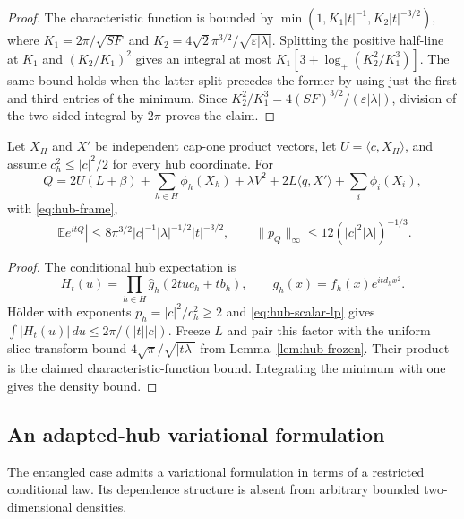 \begin{proof}
The characteristic function is bounded by
$\min(1,K_1|t|^{-1},K_2|t|^{-3/2})$, where
$K_1=2\pi/\sqrt{SF}$ and
$K_2=4\sqrt2\pi^{3/2}/\sqrt{\varepsilon|\lambda|}$.
Splitting the positive half-line at $K_1$ and $(K_2/K_1)^2$ gives
an integral at most
$K_1[3+\log_+(K_2^2/K_1^3)]$.
The same bound holds when the latter split precedes the former by
using just the first and third entries of the minimum.
Since $K_2^2/K_1^3=4(SF)^{3/2}/(\varepsilon|\lambda|)$,
division of the two-sided integral by $2\pi$ proves the claim.
\end{proof}

\begin{proposition}\label{prop:hub-spread}
Let $X_H$ and $X'$ be independent cap-one product vectors, let
$U=\langle c,X_H\rangle$, and assume
$c_h^2\le|c|^2/2$ for every hub coordinate.  For
\[
 Q=2U(L+\beta)+\sum_{h\in H}\phi_h(X_h)
       +\lambda V^2+2L\langle q,X'\rangle+\sum_i\phi_i(X_i),
\]
with \eqref{eq:hub-frame},
\[
 |\mathbb E e^{itQ}|\le
 8\pi^{3/2}|c|^{-1}|\lambda|^{-1/2}|t|^{-3/2},
 \qquad
 \|p_Q\|_\infty\le12(|c|^2|\lambda|)^{-1/3}.
\]
\end{proposition}

\begin{proof}
The conditional hub expectation is
\[
 H_t(u)=\prod_{h\in H}
  \widehat g_h(2tuc_h+tb_h),\qquad
 g_h(x)=f_h(x)e^{itd_hx^2}.
\]
H\"older with exponents $p_h=|c|^2/c_h^2\ge2$ and
\eqref{eq:hub-scalar-lp} gives
$\int|H_t(u)|\,du\le2\pi/(|t||c|)$.
Freeze $L$ and pair this factor with the uniform slice-transform bound
$4\sqrt\pi/\sqrt{|t\lambda|}$ from
Lemma~\ref{lem:hub-frozen}.  Their product is the claimed
characteristic-function bound.  Integrating the minimum with one gives
the density bound.
\end{proof}

\subsection{An adapted-hub variational formulation}

The entangled case admits a variational formulation in terms of a
restricted conditional law.  Its dependence structure is absent from
arbitrary bounded two-dimensional densities.

